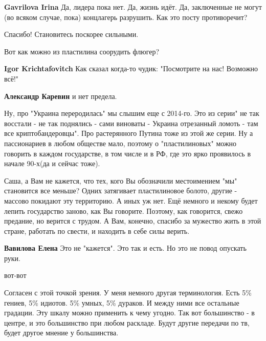 \begin{itemize}
\begin{itemize} %
\textbf{Gavrilova Irina} Да, лидера пока нет. Да, жизнь идёт. Да, заключенные не могут (во всяком случае, пока) концлагерь разрушить. Как это посту противоречит?
\end{itemize} %

Спасибо! Становитесь поскорее сильными.

Вот как можно из пластилина соорудить флюгер?

\begin{itemize} %
\textbf{Igor Krichtafovitch} Как сказал когда-то чудик: "Посмотрите на нас! Возможно всё!"

\textbf{Александр Каревин} и нет предела.
\end{itemize} %


Ну, про "Украина переродилась" мы слышим еще с 2014-го. Это из серии" не так
восстали - не так поднялись - сами виноваты - Украина отрезанный ломоть - там все
криптобандеровцы". Про растерянного Путина тоже из этой же серии. Ну а
пассионариев в любом обществе мало, поэтому о "пластилиновых" можно говорить в
каждом государстве, в том числе и в РФ, где это ярко проявилось в начале 90-х(да
и сейчас тоже).


Саша, а Вам не кажется, что тех, кого Вы обозначили местоимением "мы"
становится все меньше? Одних затягивает пластилиновое болото, другие - массово
покидают эту территорию. А иных уж нет. Ещё немного и некому будет лепить
государство заново, как Вы говорите. Поэтому, как говорится, свежо предание, но
верится с трудом. А Вам, конечно, спасибо за мужество жить в этой стране,
работать по свести, и находить в себе силы верить.

\begin{itemize} %
\textbf{Вавилова Елена} Это не "кажется". Это так и есть. Но это не повод опускать руки.

вот-вот
\end{itemize} %


Согласен с этой точкой зрения. У меня немного другая терминология. Есть 5\%
гениев, 5\% идиотов. 5\% умных, 5\% дураков. И между ними все остальные градации.
Эту шкалу можно применить к чему угодно. Так вот большинство - в центре, и это
большинство при любом раскладе. Будут другие передачи по тв, будет другое
мнение у большинства.


\end{itemize}

